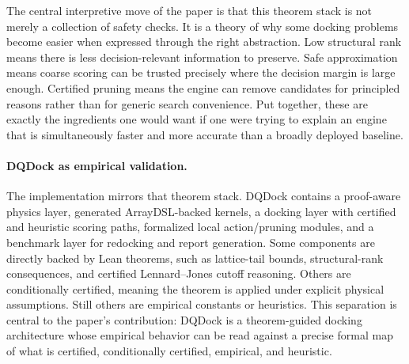 The central interpretive move of the paper is that this theorem stack is not merely a collection of safety checks. It is a theory of why some docking problems become easier when expressed through the right abstraction. Low structural rank means there is less decision-relevant information to preserve. Safe approximation means coarse scoring can be trusted precisely where the decision margin is large enough. Certified pruning means the engine can remove candidates for principled reasons rather than for generic search convenience. Put together, these are exactly the ingredients one would want if one were trying to explain an engine that is simultaneously faster and more accurate than a broadly deployed baseline.

\paragraph{DQDock as empirical validation.}
The implementation mirrors that theorem stack. DQDock contains a proof-aware physics layer, generated ArrayDSL-backed kernels, a docking layer with certified and heuristic scoring paths, formalized local action/pruning modules, and a benchmark layer for redocking and report generation. Some components are directly backed by Lean theorems, such as lattice-tail bounds, structural-rank consequences, and certified Lennard--Jones cutoff reasoning. Others are conditionally certified, meaning the theorem is applied under explicit physical assumptions. Still others are empirical constants or heuristics. This separation is central to the paper's contribution: DQDock is a theorem-guided docking architecture whose empirical behavior can be read against a precise formal map of what is certified, conditionally certified, empirical, and heuristic.

